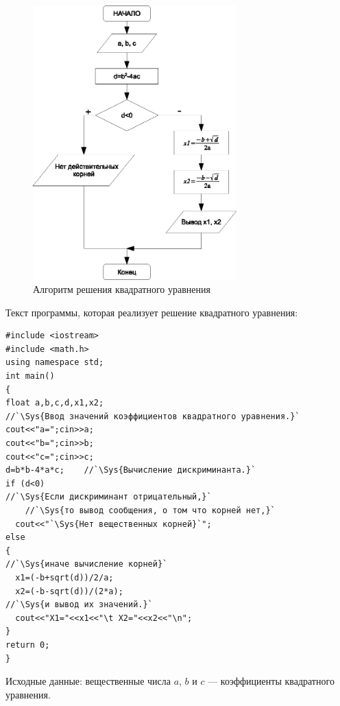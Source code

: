 \begin{figure}[htb]
\begin{center}
\includegraphics[width=0.7\textwidth]{img/ris_3_15}
\caption{Алгоритм решения квадратного уравнения}
\label{ch03:refDrawing14}
\end{center}
\end{figure}

Текст программы, которая реализует решение квадратного уравнения: 
\begin{lstlisting}
#include <iostream>
#include <math.h>
using namespace std;
int main()
{
float a,b,c,d,x1,x2;
//`\Sys{Ввод значений коэффициентов квадратного уравнения.}`
cout<<"a=";cin>>a;
cout<<"b=";cin>>b;
cout<<"c=";cin>>c;
d=b*b-4*a*c;	//`\Sys{Вычисление дискриминанта.}`
if (d<0)        
//`\Sys{Если дискриминант отрицательный,}`
    //`\Sys{то вывод сообщения, о том что корней нет,}`
  cout<<"`\Sys{Нет вещественных корней}`";
else
{
//`\Sys{иначе вычисление корней}`
  x1=(-b+sqrt(d))/2/a;
  x2=(-b-sqrt(d))/(2*a);
//`\Sys{и вывод их значений.}`
  cout<<"X1="<<x1<<"\t X2="<<x2<<"\n";
}
return 0;
}
\end{lstlisting}


Исходные данные: вещественные числа $a$, $b$ и $c$ --- коэффициенты
квадратного уравнения.

